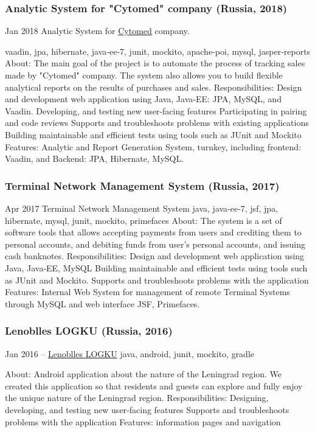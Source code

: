 \documentclass{vl}
\begin{document}
    \subsubsection{Analytic System for "Cytomed" company (Russia, 2018)}
    Jan 2018 Analytic System for \href{https://cytomed.ru/en/}{Cytomed} company.

    vaadin, jpa, hibernate, java‐ee‐7, junit, mockito, apache‐poi, mysql, jasper‐reports
    About: The main goal of the project is to automate the process of tracking sales made by "Cytomed" company. The system
    also allows you to build flexible analytical reports on the results of purchases and sales.
    Responsibilities:
    Design and development web application using Java, Java‐EE: JPA, MySQL, and Vaadin.
    Developing, and testing new user‐facing features
    Participating in pairing and code reviews
    Supports and troubleshoots problems with existing applications
    Building maintainable and efficient tests using tools such as JUnit and Mockito
    Features:
    Analytic and Report Generation System, turnkey, including frontend: Vaadin, and Backend: JPA, Hibernate,
    MySQL.

    \subsubsection{Terminal Network Management System (Russia, 2017)}
    Apr 2017 Terminal Network Management System
    java, java‐ee‐7, jsf, jpa, hibernate, mysql, junit, mockito, primefaces
    About: The system is a set of software tools that allows accepting payments from users and crediting them to personal
    accounts, and debiting funds from user's personal accounts, and issuing cash banknotes.
    Responsibilities:
    Design and development web application using Java, Java‐EE, MySQL
    Building maintainable and efficient tests using tools such as JUnit and Mockito.
    Supports and troubleshoots problems with the application
    Features:
    Internal Web System for management of remote Terminal Systems through MySQL and web interface JSF,
    Primefaces.

    \subsubsection{Lenoblles LOGKU (Russia, 2016)}
    Jan 2016 – \href{https://play.google.com/store/apps/details?id=com.altinntech.oopt_lo}{Lenoblles LOGKU}
    java, android, junit, mockito, gradle

    About: Android application about the nature of the Leningrad region. We created this application so that residents and
    guests can explore and fully enjoy the unique nature of the Leningrad region.
    Responsibilities:
    Designing, developing, and testing new user‐facing features
    Supports and troubleshoots problems with the application
    Features:
    information pages and navigation
\end{document}
